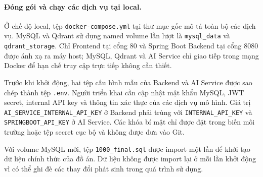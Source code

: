 \paragraph{Đóng gói và chạy các dịch vụ tại local.}

Ở chế độ local, tệp \texttt{docker-compose.yml} tại thư mục gốc mô tả toàn bộ các dịch vụ. MySQL và Qdrant sử dụng named volume lần lượt là \texttt{mysql\_data} và \texttt{qdrant\_storage}. Chỉ Frontend tại cổng 80 và Spring Boot Backend tại cổng 8080 được ánh xạ ra máy host; MySQL, Qdrant và AI Service chỉ giao tiếp trong mạng Docker để hạn chế truy cập trực tiếp không cần thiết.

Trước khi khởi động, hai tệp cấu hình mẫu của Backend và AI Service được sao chép thành tệp \texttt{.env}. Người triển khai cần cập nhật mật khẩu MySQL, JWT secret, internal API key và thông tin xác thực của các dịch vụ mô hình. Giá trị \texttt{AI\_SERVICE\_INTERNAL\_API\_KEY} ở Backend phải trùng với \texttt{INTERNAL\_API\_KEY} và \texttt{SPRINGBOOT\_API\_KEY} ở AI Service. Các khóa bí mật chỉ được đặt trong biến môi trường hoặc tệp secret cục bộ và không được đưa vào Git.

Với volume MySQL mới, tệp \texttt{1000\_final.sql} được import một lần để khởi tạo dữ liệu chính thức của đồ án. Dữ liệu không được import lại ở mỗi lần khởi động vì có thể ghi đè các thay đổi phát sinh trong quá trình sử dụng.

